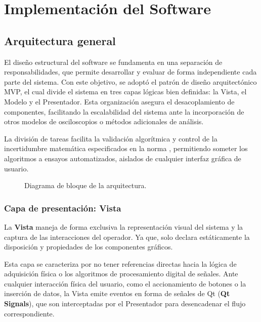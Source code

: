 \newpage
\chapter{Implementación del Software}
\vspace{3\baselineskip}

\section{Arquitectura general}
\label{subsec:estructura_arquitectura}

El diseño estructural del software se fundamenta en una separación de responsabilidades, que permite desarrollar y evaluar de forma independiente cada parte del sistema. Con este objetivo, se adoptó el patrón de diseño arquitectónico MVP, el cual divide el sistema en tres capas lógicas bien definidas: la Vista, el Modelo y el Presentador. Esta organización asegura el desacoplamiento de componentes, facilitando la escalabilidad del sistema ante la incorporación de otros modelos de osciloscopios o métodos adicionales de análisis.

La división de tareas facilita la validación algorítmica y control de la incertidumbre matemática especificados en la norma \cite{iec61083_2}, permitiendo someter los algoritmos a ensayos automatizados, aislados de cualquier interfaz gráfica de usuario.

\begin{figure}[H]
    \caption{Diagrama de bloque de la arquitectura.}
    \label{fig:Lab_1_Circ_1_V1-esquema}
\end{figure}

\subsection{Capa de presentación: Vista}
\label{subsec:vista}

La \textbf{Vista} maneja de forma exclusiva la representación visual del sistema y la captura de las interacciones del operador. Ya que, solo declara estáticamente la disposición y propiedades de los componentes gráficos.

Esta capa se caracteriza por no tener referencias directas hacia la lógica de adquisición física o los algoritmos de procesamiento digital de señales. Ante cualquier interacción física del usuario, como el accionamiento de botones o la inserción de datos, la Vista emite eventos en forma de señales de Qt (\textbf{Qt Signals}), que son interceptadas por el Presentador para desencadenar el flujo correspondiente.

